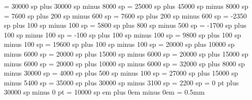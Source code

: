 \greinterwordspacetextnotes = 30000 sp plus 30000 sp minus 8000 sp
\greinterwordspacetext = 25000 sp plus 45000 sp minus 8000 sp
\grebitrivirspace = 7600 sp plus 200 sp minus 600 sp
\grebitristrospace = 7600 sp plus 200 sp minus 600 sp
\grepunctuminclinatumshift= -2350 sp plus 100 sp minus 100 sp
\grebeforepunctainclinatashift= 5800 sp plus 800 sp minus 500 sp
\grepunctuminclinatumanddebilisshift= -1700 sp plus 100 sp minus 100 sp
\grepunctuminclinatumdebilisshift= -100 sp plus 100 sp minus 100 sp
\grepunctuminclinatumbigshift= 9800 sp plus 100 sp minus 100 sp
\grepunctuminclinatummaxshift= 19600 sp plus 100 sp minus 100 sp
\grespacearoundsmallbar = 20000 sp plus 10000 sp minus 6000 sp
\grespacearoundminor = 20000 sp plus 15000 sp minus 6000 sp
\grespacearoundmaior = 20000 sp plus 15000 sp minus 6000 sp
\grespacearoundfinalis = 20000 sp plus 10000 sp minus 6000 sp
\grespacebeforefinalfinalis= 32000 sp plus 8000 sp minus 30000 sp
\grespacearoundclefbars= 4000 sp plus 500 sp minus 100 sp
\gretextbartextspace = 27000 sp plus 15000 sp minus 5400 sp
\grenotebarspace = 35000 sp plus 30000 sp minus 3100 sp
\gremaximumspacewithoutdash = 2200 sp
\greafterclefnospace = 0 pt plus 30000 sp minus 0 pt
\greadditionallineswidth = 10000 sp
 em plus 0em minus 0em
\greminimalspaceatlinebeginning=1mm
\greaboveinitialseparation = 0.5mm

